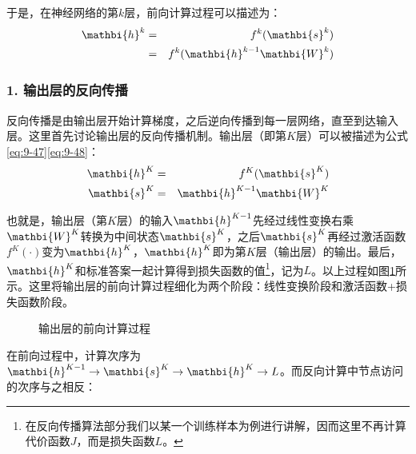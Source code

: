 \parinterval  于是，在神经网络的第$ k $层，前向计算过程可以描述为：
\begin{eqnarray}
{\mathbi{h}}^k & = & f^k({\mathbi{s}}^k) \nonumber \nonumber \\
            & = & f^k({\mathbi{h}}^{k-1}{\mathbi{W}}^k)
\label{eq:9-46}
\end{eqnarray}


\subsubsection{1. 输出层的反向传播}

\parinterval  反向传播是由输出层开始计算梯度，之后逆向传播到每一层网络，直至到达输入层。这里首先讨论输出层的反向传播机制。输出层（即第$ K $层）可以被描述为公式\eqref{eq:9-47}\eqref{eq:9-48}：
\begin{eqnarray}
{\mathbi{h}}^K&=&f^K({\mathbi{s}}^K)\label{eq:9-47}\\
{\mathbi{s}}^K&=&{\mathbi{h}}^{K-1}{\mathbi{W}}^K
\label{eq:9-48}
\end{eqnarray}

\noindent  也就是，输出层（第$ K $层）的输入$ {\mathbi{h}}^{K-1} $先经过线性变换右乘${\mathbi{W}}^K $转换为中间状态$ {\mathbi{s}}^K $，之后${\mathbi{s}}^K $再经过激活函数$ f^K(\cdot) $变为$ {\mathbi{h}}^K $，$ {\mathbi{h}}^K $即为第$ K $层（输出层）的输出。最后，$ {\mathbi{h}}^K $和标准答案一起计算得到损失函数的值\footnote{在反向传播算法部分我们以某一个训练样本为例进行讲解，因而这里不再计算代价函数$J$，而是损失函数$L$。}，记为$ L $。以上过程如图\ref{fig:9-53}所示。这里将输出层的前向计算过程细化为两个阶段：线性变换阶段和激活函数+损失函数阶段。

\begin{figure}[htp]
\centering

\caption{输出层的前向计算过程}
\label{fig:9-53}
\end{figure}

\parinterval  在前向过程中，计算次序为${\mathbi{h}}^{K-1}\rightarrow {\mathbi{s}}^K\rightarrow {\mathbi{h}}^K  \rightarrow L $。而反向计算中节点访问的次序与之相反：


